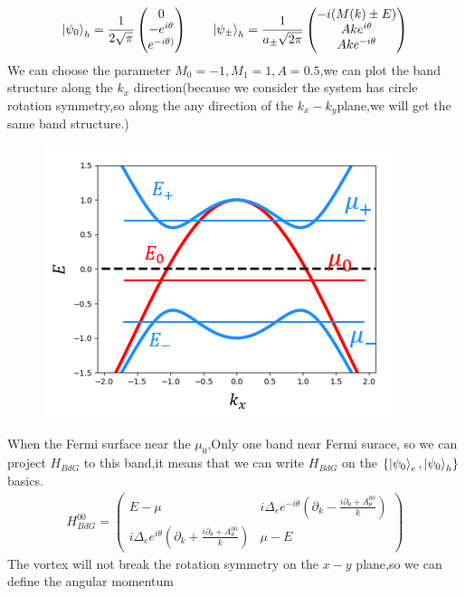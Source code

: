 \documentclass[4pt]{article}
\begin{document}
\begin{align}
	\ket{\psi_0}_h=\frac{1}{2\sqrt{\pi}}
	\begin{pmatrix}
		0\\
		-e^{i\theta}\\
		e^{-i\theta)}
	\end{pmatrix}
	\qquad
	\ket{\psi_{\pm}}_h=\frac{1}{a_{\pm}\sqrt{2\pi}}
	\begin{pmatrix}
		-i(M(k)\pm E)\\
		Ake^{i\theta}\\
		Ake^{-i\theta}
	\end{pmatrix}
\end{align}	
	We can choose the parameter $M_0=-1,M_1=1,A=0.5$,we can plot the band structure along the $k_x$ direction(because we consider the system has circle rotation symmetry,so along the any direction of the $k_x-k_y$plane,we will get the same band structure.)
	\begin{figure}[ht]
		\centering
		\includegraphics[scale=1]{figure/1}
	\end{figure}
When the Fermi surface near the $\mu_0$,Only one band near Fermi surace, so we can project $H_{BdG}$ to this band,it means that we can write $H_{BdG}$ on the $\{\ket{\psi_0}_e,\ket{\psi_0}_h\}$ basics.
	\begin{align}
		H_{BdG}^{00}=
		\begin{pmatrix}
		E-\mu & i\Delta_ee^{-i\theta}(\partial_k-\frac{i\partial_{\theta}+A_{\theta}^{00}}{k})\\
		i\Delta_ee^{i\theta}(\partial_k+\frac{i\partial_{\theta}+A_{\theta}^{00}}{k})& \mu-E
	\end{pmatrix}
	\end{align}
The vortex will not break the rotation symmetry on the $x-y$ plane,so we can define the angular momentum
\end{document}
